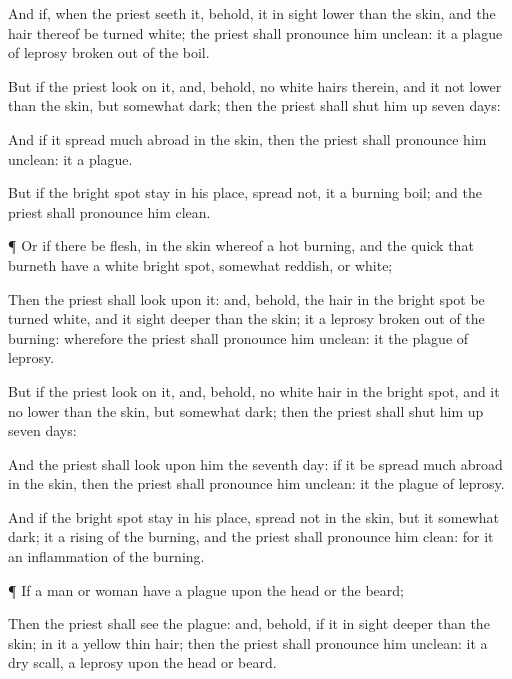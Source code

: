 {And if, when the
priest
seeth it, behold, it
{} in
sight
lower than the
skin, and the
hair thereof be
turned
white; the
priest shall pronounce him
unclean: it
{} a
plague of
leprosy
broken out of the
boil.

But if the
priest
look on it, and, behold,
{} no
white
hairs therein, and
{} it
{} not
lower than the
skin, but
{} somewhat
dark; then the
priest shall
shut him up
seven
days:

And if it spread
much
abroad in the
skin, then the
priest shall pronounce him
unclean: it
{} a
plague.

But if the bright
spot
stay in his place,
{}
spread not, it
{} a
burning
boil; and the
priest shall pronounce him
clean.


\par }{\PP {}¶ Or if there be
{}
flesh, in the
skin whereof
{} a
hot
burning, and the
quick
{} that
burneth have a
white bright
spot, somewhat
reddish, or
white;

Then the
priest shall
look upon it: and, behold,
{} the
hair in the bright
spot be
turned
white, and it
{}
sight
deeper than the
skin; it
{} a
leprosy
broken out of the
burning: wherefore the
priest shall pronounce him
unclean: it
{} the
plague of
leprosy.

But if the
priest
look on it, and, behold,
{} no
white
hair in the bright
spot, and it
{} no
lower than the
{}
skin, but
{} somewhat
dark; then the
priest shall
shut him up
seven
days:

And the
priest shall
look upon him the
seventh
day:
{} if it be spread
much
abroad in the
skin, then the
priest shall pronounce him
unclean: it
{} the
plague of
leprosy.

And if the
bright
spot
stay in his place,
{}
spread not in the
skin, but it
{} somewhat
dark; it
{} a
rising of the
burning, and the
priest shall pronounce him
clean: for it
{} an
inflammation of the
burning.


\par }{\PP {}¶ If a
man or
woman have a
plague upon the
head or the
beard;

Then the
priest shall
see the
plague: and, behold, if it
{} in
sight
deeper than the
skin;
{} in it a
yellow
thin
hair; then the
priest shall pronounce him
unclean: it
{} a dry
scall,
{} a
leprosy upon the
head or
beard.

}
